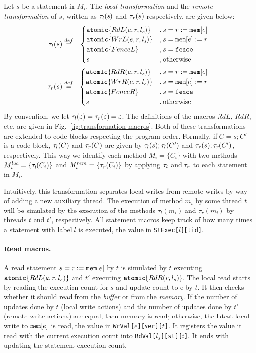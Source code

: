 \documentclass[preprint,9pt]{sigplanconf}
\begin{document}
Let $s$ be a statement in $M_i$.
The {\em local transformation} and the {\em remote transformation} of $s$, written as $\tau_{l}(s)$ and $\tau_{r}(s)$ respectively, are given below:
\begin{eqnarray*}
 \tau_{l}(s)  & \stackrel{def}{=} &
  \begin{cases}
   \mathtt{atomic}\{RdL(e,r,l_s)\} & , s=r:=\mathtt{mem}[e]\\
   \mathtt{atomic}\{WrL(e,r,l_s)\} & , s=\mathtt{mem}[e]:= r\\
   \mathtt{atomic}\{FenceL\} & , s=\mathtt{fence}\\
   s & , \textnormal{otherwise}
  \end{cases}\\
 \tau_{r}(s) & \stackrel{def}{=} &
  \begin{cases}
   \mathtt{atomic}\{RdR(e,r,l_s)\} & , s=r:=\mathtt{mem}[e]\\
   \mathtt{atomic}\{WrR(e,r,l_s)\} & , s=\mathtt{mem}[e]:= r\\
   \mathtt{atomic}\{FenceR\} & , s=\mathtt{fence}\\
   s & , \textnormal{otherwise}
  \end{cases}
\end{eqnarray*}
By convention, we let $\tau_{l}(\varepsilon)=\tau_{r}(\varepsilon)=\varepsilon$.
The definitions of the macros $RdL$, $RdR$, etc. are given in Fig.~\ref{fig:transformation-macros}.
Both of these transformations are extended to code blocks respecting the program order.
Formally, if $C=s;C'$ is a code block, $\tau_{l}(C)$ and $\tau_{r}(C)$ are given by $\tau_{l}(s); \tau_{l}(C')$ and $\tau_{r}(s); \tau_{r}(C')$, respectively.
This way we identify each method $M_i=\{C_i\}$ with two methods $M^{loc}_i=\{\tau_{l}(C_i)\}$ and $M^{rem}_i=\{\tau_{r}(C_i)\}$ by applying $\tau_{l}$ and $\tau_{r}$ to each statement in $M_i$.


Intuitively, this transformation separates local writes from remote writes by way of adding a new auxiliary thread.
The execution of method $m_i$ by some thread $t$ will be simulated by the execution of the methods $\tau_l(m_i)$ and $\tau_r(m_i)$ by threads $t$ and $t'$, respectively.
All statement macros keep track of how many times a statement with label $l$ is executed, the value in {\tt StExec[$l$][tid]}.

\paragraph{Read macros.}
A read statement $s=r:=\mathtt{mem}[e]$ by $t$ is simulated by $t$ executing $\mathtt{atomic}\{RdL(e,r,l_s)\}$ and $t'$ executing $\mathtt{atomic}\{RdR(r,l_s)\}$.
The local read starts by reading the execution count for $s$ and update count to {\alimemx e} by $t$.
It then checks whether it should read from the {\em buffer} or from the {\em memory}.
If the number of updates done by $t$ (local write actions) and the number of updates done by $t'$ (remote write actions) are equal, then memory is read; otherwise, the latest local write to $\mathtt{mem}[e]$ is read, the value in {\tt WrVal[$e$][ver][$t$]}.
It registers the value it read with the current execution count into {\tt RdVal[$l_s$][st][$t$]}.
It ends with updating the statement execution count.
\end{document}
